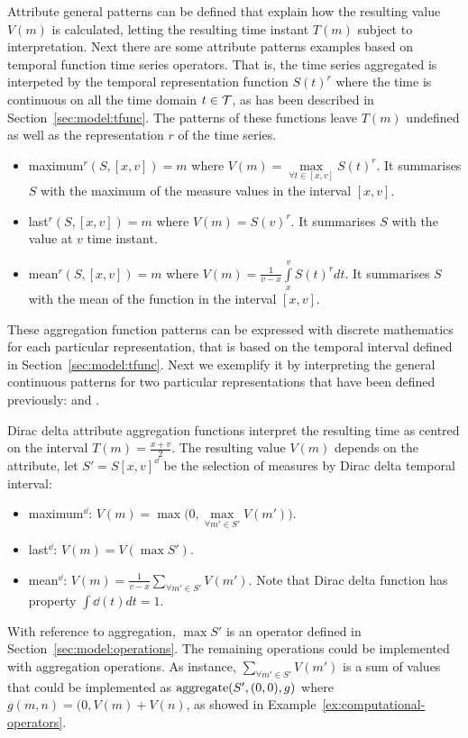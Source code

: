 Attribute general patterns can be defined that explain how the
resulting value $V(m)$ is calculated, letting the resulting time
instant $T(m)$ subject to interpretation.  Next there are some
attribute patterns examples based on temporal function time series
operators. That is, the time series aggregated is interpeted by the
temporal representation function $S(t)^r$ where the time is continuous
on all the time domain $t\in\cal{T}$, as has been described in
Section~\ref{sec:model:tfunc}. The patterns of these functions leave
$T(m)$ undefined as well as the representation $r$ of the time series.
\begin{itemize}
\item maximum$^r(S,[x,v])=m$ where $V(m) = \max\limits_{\forall t \in
    [x,v]} S(t)^r$. It summarises $S$ with the maximum of the measure
  values in the interval $[x,v]$.
\item last$^r(S,[x,v])=m$ where $V(m) = S(v)^r$. It
  summarises $S$ with the value at $v$ time instant.
\item mean$^r(S,[x,v])=m$ where $V(m) =
  \frac{1}{v-x} \int\limits_{x}^{v} S(t)^r dt$. It summarises $S$
  with the mean of the function in the interval $[x,v]$.
\end{itemize}


These aggregation function patterns can be expressed with discrete
mathematics for each particular representation, that is based on the
temporal interval defined in Section~\ref{sec:model:tfunc}. Next we
exemplify it by interpreting the general continuous patterns for two
particular representations that have been defined previously: \dd{}
and \zohe{}.


Dirac delta attribute aggregation functions interpret the resulting
time as centred on the interval $T(m)=\frac{x+v}{2}$. The resulting
value $V(m)$ depends on the attribute, let $S'=S[x,v]^\dd$ be the
selection of measures by Dirac delta temporal interval:
\begin{itemize}
\item maximum$^\dd$: $V(m) = \max\big(0,\max\limits_{\forall m' \in
    S'} V(m')\big)$.
\item last$^\dd$: $V(m) = V(\max S')$.
\item mean$^\dd$: $V(m) = \frac{1}{v-x} \sum\limits_{\forall m' \in S'}
  V(m')$. Note that Dirac delta function has property $\int\dd(t)dt=1$.
\end{itemize}

With reference to  aggregation, $\max S'$ is an operator
defined in Section~\ref{sec:model:operations}. The remaining
operations could be implemented with aggregation operations. As
instance, $\sum\limits_{\forall m' \in S'} V(m')$ is a sum of values
that could be implemented as $\operatorname*{aggregate}(S',(0,0),g)$ where
$g(m,n)=(0,V(m)+V(n)$, as showed in
Example~\ref{ex:computational-operators}.



